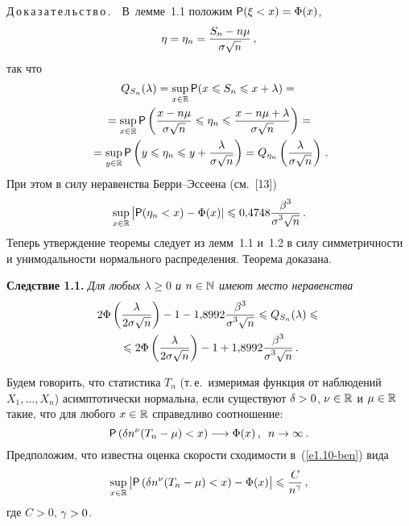 \begin{multicols}{2}
\noindent
Д\,о\,к\,а\,з\,а\,т\,е\,л\,ь\,с\,т\,в\,о\,.\ \  В~лемме~1.1 положим ${\sf P}(\xi\hm<x)\hm= \Phi(x)$,
$$
\eta=\eta_n=\displaystyle\frac{\displaystyle S_n-n\mu\mathstrut}{\displaystyle \sigma\sqrt{n}\mathstrut}\,,
$$
так что
\begin{multline*}
Q_{S_n}(\lambda)=\sup\limits_{x\in\mathbb{R}}{\sf P}(x\leqslant S_n\leqslant x+\lambda)={}\\
{}=
\sup\limits_{x\in\mathbb{R}}{\sf P}\left(\displaystyle\frac{\displaystyle x-n\mu\mathstrut}{\displaystyle \sigma\sqrt{n}\mathstrut}\leqslant \eta_n \leqslant
\displaystyle\frac{\displaystyle x-n\mu+\lambda\mathstrut}{\displaystyle \sigma\sqrt{n}\mathstrut}\right)={}
\\
{}=\sup\limits_{y\in\mathbb{R}}{\sf P}\left(y\leqslant \eta_n\leqslant y+
\displaystyle\frac{\displaystyle \lambda\mathstrut}{\displaystyle \sigma\sqrt{n}\mathstrut}\right)=
Q_{\eta_n}\left(\displaystyle\frac{\displaystyle \lambda\mathstrut}{\displaystyle \sigma\sqrt{n}\mathstrut}\right)\,.
\end{multline*}
При этом в силу неравенства Бер\-ри--Эс\-се\-ена (см.~[13])
\begin{equation*}
\sup\limits_{x\in\mathbb{R}}\big|{\sf P}(\eta_n<x)-\Phi(x)|\leqslant 0{,}4748
\displaystyle\frac{\displaystyle \beta^3\mathstrut}{\displaystyle \sigma^3\sqrt{n}\mathstrut}\,.
\end{equation*}
Теперь утверждение теоремы следует из лемм~1.1 и~1.2 в силу
симметричности и унимодальности нормального распределения. Теорема
доказана.

\smallskip

\noindent
\textbf{Следствие 1.1.} \textit{Для любых $\lambda\geqslant0$ и $n\in\mathbb N$ имеют
место неравенства}
\begin{multline*}
2\Phi\left(\displaystyle\frac{\displaystyle \lambda\mathstrut}{\displaystyle 2\sigma\sqrt{n}\mathstrut}\right)-1-1{,}8992
\displaystyle\frac{\displaystyle \beta^3\mathstrut}{\displaystyle \sigma^3\sqrt{n}\mathstrut}\leqslant Q_{S_n}(\lambda)\leqslant{}\\
{}\leqslant
2\Phi\left(\displaystyle\frac{\displaystyle \lambda\mathstrut}{\displaystyle 2\sigma\sqrt{n}\mathstrut}\right)-1+1{,}8992
\displaystyle\frac{\displaystyle \beta^3\mathstrut}{\displaystyle \sigma^3\sqrt{n}\mathstrut}\,.
\end{multline*}

\smallskip

Будем говорить, что статистика $T_n$ (т.\,е.\ измеримая функция от
наблюдений $X_1,\ldots,X_n$) асимптотически нормальна, если
существуют $\delta\hm>0$, $\nu\hm\in\r$ и $\mu\hm\in\r$ такие, что для любого
$x\hm\in\r$ справедливо соотношение:
\begin{equation}
{\sf P}\left(\delta n^{\nu}(T_n-\mu)<x\right)\longrightarrow\Phi(x)\,, \enskip
n\to\infty\,. \label{e1.10-ben}
\end{equation}
Предположим, что известна оценка скорости сходимости в~(\ref{e1.10-ben}) вида
\begin{equation}
\sup\limits_{x\in\mathbb{R}}\big|{\sf P}\left(\delta n^{\nu}(T_n-\mu)<x\right)-
\Phi(x)\big|\leqslant \displaystyle\frac{\displaystyle C\mathstrut}{\displaystyle n^{\gamma}\mathstrut}\,,\label{e1.11-ben}
\end{equation}
где $C>0$, $\gamma\hm>0$.


\end{multicols}
